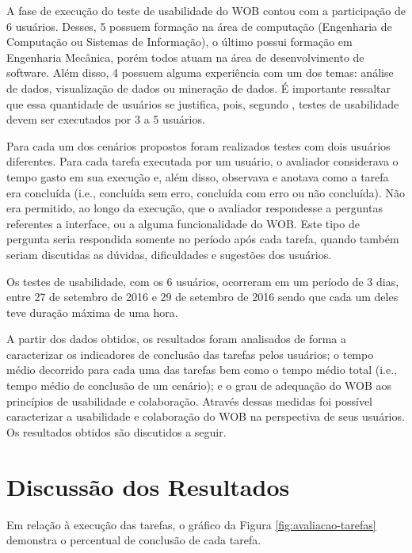 A fase de execução do teste de usabilidade do WOB contou com a participação de 6 usuários. 
Desses, 5 possuem formação na área de computação (Engenharia de Computação ou Sistemas de 
Informação), o último possui formação em Engenharia Mecânica, porém todos atuam na área de 
desenvolvimento de software. Além disso, 4 possuem alguma experiência com um dos temas: 
análise de dados, visualização de dados ou mineração de dados. É importante ressaltar que
essa quantidade de usuários se justifica, pois, segundo , testes de 
usabilidade devem ser executados por 3 a 5 usuários.

Para cada um dos cenários propostos foram realizados testes com dois usuários diferentes. 
Para cada tarefa executada por um usuário, o avaliador considerava o tempo gasto em sua 
execução e, além disso, observava e anotava como a tarefa era concluída (i.e., concluída 
sem erro, concluída com erro ou não concluída). Não era permitido, ao longo da execução,
que o avaliador respondesse a perguntas referentes a interface, ou a alguma funcionalidade 
do WOB. Este tipo de pergunta seria respondida somente no período após cada tarefa, quando 
também seriam discutidas as dúvidas, dificuldades e sugestões dos usuários. 

Os testes de usabilidade, com os 6 usuários, ocorreram em um período de 3 dias, entre 27 de 
setembro de 2016 e 29 de setembro de 2016 sendo que cada um deles teve duração máxima de 
uma hora.

A partir dos dados obtidos, os resultados foram analisados de forma a caracterizar os 
indicadores de conclusão das tarefas pelos usuários; o tempo médio decorrido para cada uma 
das tarefas bem como o tempo médio total (i.e., tempo médio de conclusão de um cenário); e 
o grau de adequação do WOB aos princípios de usabilidade e colaboração. Através dessas 
medidas foi possível caracterizar a usabilidade e colaboração do WOB na perspectiva de 
seus usuários. Os resultados obtidos são discutidos a seguir.

\section{Discussão dos Resultados}
\label{sec:metodologia-resultados}

Em relação à execução das tarefas, o gráfico da Figura \ref{fig:avaliacao-tarefas} demonstra 
o percentual de conclusão de cada tarefa.

